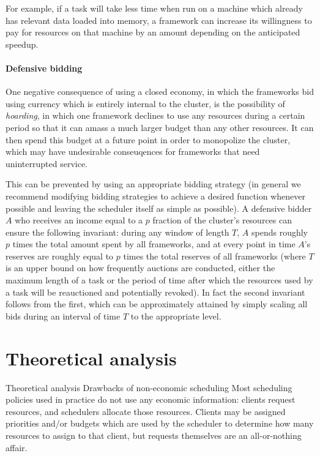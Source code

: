 \documentclass{acm_proc_article-sp}
\begin{document}
For example, if a task will take less time when run on a machine
which already has relevant data loaded into memory,
a framework can increase its willingness to pay for resources on that machine
by an amount depending on the anticipated speedup.

\paragraph{Defensive bidding} One negative consequence of using a closed economy,
in which the frameworks bid using currency which is entirely internal to the cluster,
is the possibility of \emph{hoarding}, in which one framework
declines to use any resources during a certain period so that it can amass
a much larger budget than any other resources.
It can then spend this budget at a future point in order to monopolize the cluster,
which may have undesirable conseuqences for frameworks that need uninterrupted service.

This can be prevented by using an appropriate bidding strategy
(in general we recommend modifying bidding strategies to achieve a desired
function whenever possible and leaving the scheduler itself as simple as possible).
A defensive bidder $A$ who receives an income equal to a $p$ fraction
of the cluster's resources can ensure the following invariant:
during any window of length $T$, $A$ spends roughly $p$ times the total amount
spent by all frameworks, and at every point in time $A$'s reserves are roughly equal to $p$
times the total reserves of all frameworks (where $T$ is an upper bound on how frequently auctions are conducted,
either the maximum length of a task or the period of time after which the resources used by a task
will be reauctioned and potentially revoked).
In fact the second invariant follows from the first, which can be approximately attained
by simply scaling all bids during an interval of time $T$ to the appropriate level.

\section{Theoretical analysis}
\label{sec:theory}

Theoretical analysis
Drawbacks of non-economic scheduling
Most scheduling policies used in practice do not use any economic information: clients request resources, and schedulers allocate those resources. Clients may be assigned priorities and/or budgets which are used by the scheduler to determine how many resources to assign to that client, but requests themselves are an all-or-nothing affair.
\end{document}
